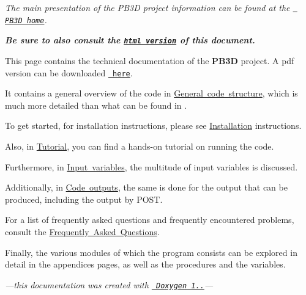 {\itshape The main presentation of the P\+B3D project information can be found at the \href{https://pb3d.github.io}{\texttt{ P\+B3D home}}.}

 
\textit{\textbf{Be sure to also consult the \href{https://pb3d.github.io/Doxygen/html/index.html}{\tt html version} of this document.}}


This page contains the technical documentation of the {\bfseries{P\+B3D}} project. A pdf version can be downloaded \href{https://pb3d.github.io/PB3D_manual.pdf}{\texttt{ here}}.

It contains a general overview of the code in \mbox{\hyperlink{page_overview}{General code structure}}, which is much more detailed than what can be found in \cite{Weyens2017PB3D}.

To get started, for installation instructions, please see \mbox{\hyperlink{page_installation}{Installation}} instructions.

Also, in \mbox{\hyperlink{page_tutorial}{Tutorial}}, you can find a hands-\/on tutorial on running the code.

Furthermore, in \mbox{\hyperlink{page_inputs}{Input variables}}, the multitude of input variables is discussed.

Additionally, in \mbox{\hyperlink{page_outputs}{Code outputs}}, the same is done for the output that can be produced, including the output by P\+O\+ST.

For a list of frequently asked questions and frequently encountered problems, consult the \mbox{\hyperlink{page_faq}{Frequently Asked Questions}}.

  
Finally, the various modules of which the program consists can be explored in detail in the appendices pages, as well as the procedures and the variables.


\begin{center}{\itshape —this documentation was created with \href{http://www.doxygen.org/index.html}{\texttt{ Doxygen 1..}}—}\end{center}  